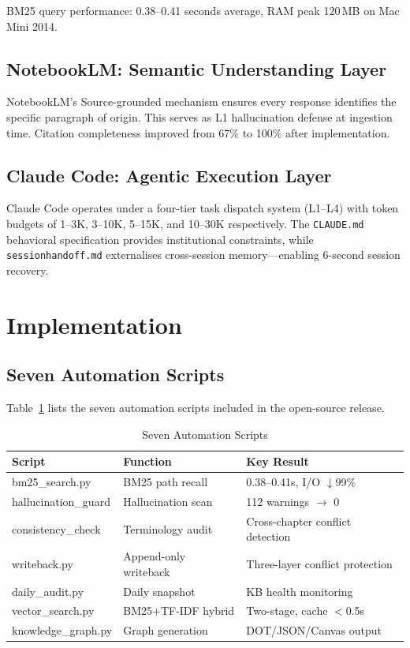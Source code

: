 \documentclass[conference]{IEEEtran}
\begin{document}
BM25 query performance: 0.38--0.41 seconds average, RAM peak 120\,MB on
Mac Mini 2014.

\subsection{NotebookLM: Semantic Understanding Layer}

NotebookLM's Source-grounded mechanism ensures every response identifies the
specific paragraph of origin. This serves as L1 hallucination defense at
ingestion time. Citation completeness improved from 67\% to 100\% after
implementation.

\subsection{Claude Code: Agentic Execution Layer}

Claude Code operates under a four-tier task dispatch system (L1--L4) with
token budgets of 1--3K, 3--10K, 5--15K, and 10--30K respectively. The
\texttt{CLAUDE.md} behavioral specification provides institutional
constraints, while \texttt{sessionhandoff.md} externalises cross-session
memory---enabling 6-second session recovery.

\section{Implementation}

\subsection{Seven Automation Scripts}

Table~\ref{tab:scripts} lists the seven automation scripts included in the
open-source release.

\begin{table}[ht]
\caption{Seven Automation Scripts}
\label{tab:scripts}
\centering
\begin{tabular}{p{2.4cm}p{2.4cm}p{2.4cm}}
\toprule
\textbf{Script} & \textbf{Function} & \textbf{Key Result} \\
\midrule
bm25\_search.py      & BM25 path recall        & 0.38--0.41s, I/O $\downarrow$99\% \\
hallucination\_guard & Hallucination scan      & 112 warnings $\to$ 0 \\
consistency\_check   & Terminology audit       & Cross-chapter conflict detection \\
writeback.py         & Append-only writeback   & Three-layer conflict protection \\
daily\_audit.py      & Daily snapshot          & KB health monitoring \\
vector\_search.py    & BM25+TF-IDF hybrid      & Two-stage, cache $<$0.5s \\
knowledge\_graph.py  & Graph generation        & DOT/JSON/Canvas output \\
\bottomrule
\end{tabular}
\end{table}
\end{document}
